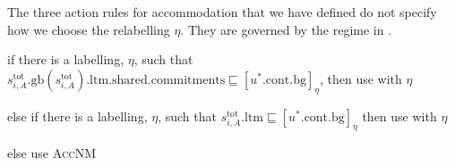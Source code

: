 


The three action rules for accommodation that we have defined do not
specify how we choose the relabelling $\eta$.  They are governed by
the regime in \nexteg{}.
\begin{ex} 
\begin{subex} 
 
\item if there is a labelling, $\eta$, such that
$s_{i,A}^{\text{tot}}.\text{gb}(s_{i,A}^{\text{tot}}).\text{ltm}.\text{shared}.\text{commitments}\sqsubseteq[u^*.\text{cont}.\text{bg}]_\eta$,
  then use  with $\eta$ 
 
\item else if there is a labelling, $\eta$, such that
  $s_{i,A}^{\text{tot}}.\text{ltm}\sqsubseteq[u^*.\text{cont}.\text{bg}]_\eta$
  then use  with $\eta$

  
\item else use \textsc{AccNM}
 
\end{subex} 
   
\end{ex} 
  

